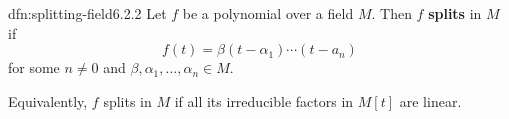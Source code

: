 \documentclass[landscape, 8pt]{extarticle}
\begin{document}
\begin{multicols}{3}
\begin{dfn}{dfn:splitting-field}{6.2.2}
    Let $f$ be a polynomial over a field $M$. Then $f$ \textbf{splits} in $M$ if
    \[f(t) = \beta(t - \alpha_{1}) \cdots (t - a_{n})\]
    for some $n \ne 0$ and $\beta, \alpha_{1},\dots,\alpha_{n}\in M$.

    Equivalently, $f$ splits in $M$ if all its irreducible factors in $M[t]$ are linear.
\end{dfn}


\lipsum[1-6]
\end{multicols}
\end{document}
